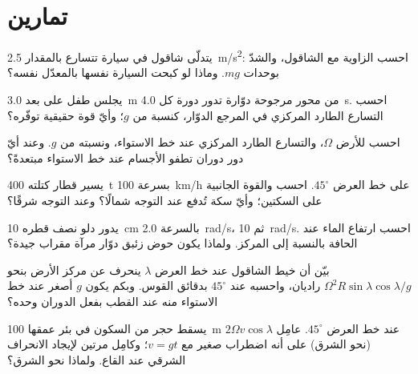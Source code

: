 \section{تمارين}

\begin{exercise}[$\star$]\label{exo:b1:non-inertial-frames:1}
يتدلّى شاقول في سيارة تتسارع بالمقدار \qty{2.5}{m/s^2}: احسب الزاوية مع
الشاقول، والشدّ بوحدات $mg$. وماذا لو كبحت السيارة نفسها
بالمعدّل نفسه؟
\end{exercise}

\begin{exercise}[$\star$]\label{exo:b1:non-inertial-frames:2}
يجلس طفل على بعد \qty{3.0}{m} من محور مرجوحة دوّارة تدور دورة
كل \qty{4.0}{s}. احسب التسارع الطارد المركزي في المرجع الدوّار، كنسبة
من $g$؛ وأيّ قوة حقيقية توفّره؟
\end{exercise}

\begin{exercise}[$\star$]\label{exo:b1:non-inertial-frames:3}
احسب  للأرض $\Omega$، والتسارع الطارد المركزي
عند خط الاستواء، ونسبته من $g$. وعند أيّ دور دوران تطفو
الأجسام عند خط الاستواء مبتعدةً؟
\end{exercise}

\begin{exercise}[$\star$]\label{exo:b1:non-inertial-frames:4}
يسير قطار كتلته \qty{400}{t} بسرعة \qty{100}{km/h} على خط العرض $45^\circ$.
احسب  والقوة الجانبية على السكتين؛ وأيّ سكة
تُدفع عند التوجه شمالًا؟ وعند التوجه شرقًا؟
\end{exercise}

\begin{exercise}[$\star\star$]\label{exo:b1:non-inertial-frames:5}
يدور دلو نصف قطره \qty{10}{cm} بالسرعة \qty{2.0}{rad/s}، ثم
\qty{10}{rad/s}. احسب ارتفاع الماء عند الحافة بالنسبة إلى المركز.
ولماذا يكون حوض زئبق دوّار مرآة مقراب جيدة؟
\end{exercise}

\begin{exercise}[$\star\star$]\label{exo:b1:non-inertial-frames:6}
بيّن أن خيط الشاقول عند خط العرض $\lambda$ ينحرف عن مركز
الأرض بنحو $\Omega^2R\sin\lambda\cos\lambda/g$ راديان، واحسبه
عند $45^\circ$ بدقائق القوس. وبكم يكون $g$ أصغر عند خط الاستواء
منه عند القطب بفعل الدوران وحده؟
\end{exercise}

\begin{exercise}[$\star\star$]\label{exo:b1:non-inertial-frames:7}
يسقط حجر من السكون في بئر عمقها \qty{100}{m} عند خط العرض $45^\circ$.
عامِل  $2\Omega v\cos\lambda$ (نحو الشرق) على أنه اضطراب
صغير مع $v = gt$؛ وكامِل مرتين لإيجاد الانحراف الشرقي
عند القاع. ولماذا نحو الشرق؟
\end{exercise}

